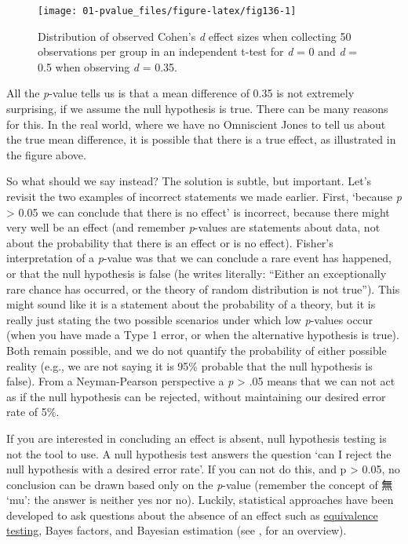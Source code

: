 \documentclass[
  oneside]{book}
\begin{document}
\begin{figure}

{\centering \texttt{[image: 01-pvalue\_files/figure-latex/fig136-1]} 

}

\caption{Distribution of observed Cohen's \emph{d} effect sizes when collecting 50 observations per group in an independent t-test for \emph{d} = 0 and \emph{d} = 0.5 when observing \emph{d} = 0.35.}\label{fig:fig136}
\end{figure}

All the \emph{p}-value tells us is that a mean difference of 0.35 is not extremely surprising, if we assume the null hypothesis is true. There can be many reasons for this. In the real world, where we have no Omniscient Jones to tell us about the true mean difference, it is possible that there is a true effect, as illustrated in the figure above.

So what should we say instead? The solution is subtle, but important. Let's revisit the two examples of incorrect statements we made earlier. First, `because \emph{p} \textgreater{} 0.05 we can conclude that there is no effect' is incorrect, because there might very well be an effect (and remember \emph{p}-values are statements about data, not about the probability that there is an effect or is no effect). Fisher's interpretation of a \emph{p}-value was that we can conclude a rare event has happened, or that the null hypothesis is false (he writes literally: ``Either an exceptionally rare chance has occurred, or the theory of random distribution is not true''). This might sound like it is a statement about the probability of a theory, but it is really just stating the two possible scenarios under which low \emph{p}-values occur (when you have made a Type 1 error, or when the alternative hypothesis is true). Both remain possible, and we do not quantify the probability of either possible reality (e.g., we are not saying it is 95\% probable that the null hypothesis is false). From a Neyman-Pearson perspective a \emph{p} \textgreater{} .05 means that we can not act as if the null hypothesis can be rejected, without maintaining our desired error rate of 5\%.

If you are interested in concluding an effect is absent, null hypothesis testing is not the tool to use. A null hypothesis test answers the question `can I reject the null hypothesis with a desired error rate'. If you can not do this, and p \textgreater{} 0.05, no conclusion can be drawn based only on the \emph{p}-value (remember the concept of 無 `mu': the answer is neither yes nor no). Luckily, statistical approaches have been developed to ask questions about the absence of an effect such as \protect\hyperlink{equivalencetest}{equivalence testing}, Bayes factors, and Bayesian estimation (see \citet{harms_making_2018}, for an overview).
\end{document}
